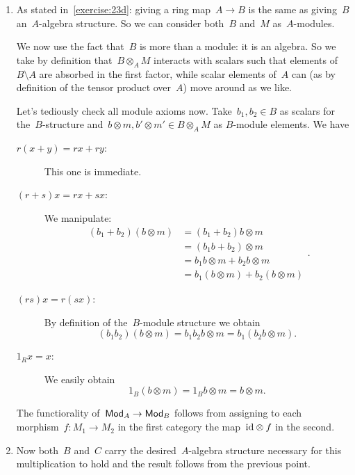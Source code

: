 \begin{exercise} %
  \label{exercise:23k}
  \begin{enumerate}
    \item As stated in~\autoref{exercise:23d}: giving a ring map~$A\to B$ is the same as giving~$B$ an~$A$\nobreakdash-algebra structure. So we can consider both~$B$ and~$M$ as~$A$\nobreakdash-modules.

      We now use the fact that~$B$ is more than a module: it is an algebra. So we take by definition that~$B\otimes_A M$ interacts with scalars such that elements of~$B\setminus A$ are absorbed in the first factor, while scalar elements of~$A$ can (as by definition of the tensor product over~$A$) move around as we like.
      
      Let's tediously check all module axioms now. Take~$b_1,b_2\in B$ as scalars for the~$B$\nobreakdash-structure and~$b\otimes m,b'\otimes m'\in B\otimes_A M$ as $B$\nobreakdash-module elements. We have
      \begin{description}
        \item[$r(x+y)=rx+ry$:] This one is immediate.

        \item[$(r+s)x=rx+sx$:] We manipulate:
          \begin{equation}
            \begin{aligned}
              (b_1+b_2)(b\otimes m)&=(b_1+b_2)b\otimes m \\
              &=(b_1b+b_2)\otimes m \\
              &=b_1b\otimes m+b_2b\otimes m \\
              &=b_1(b\otimes m)+b_2(b\otimes m)
            \end{aligned}.
          \end{equation}

        \item[$(rs)x=r(sx)$:] By definition of the~$B$\nobreakdash-module structure we obtain
          \begin{equation}
            (b_1b_2)(b\otimes m)=b_1b_2b\otimes m=b_1(b_2b\otimes m).
          \end{equation}

        \item[$1_Rx=x$:] We easily obtain
          \begin{equation}
            1_B(b\otimes m)=1_Bb\otimes m=b\otimes m.
          \end{equation}
      \end{description}

      The functiorality of~$\mathsf{Mod}_A\to\mathsf{Mod}_B$ follows from assigning to each morphism~$f\colon M_1\to M_2$ in the first category the map~$\mathrm{id}\otimes f$ in the second.

    \item Now both~$B$ and~$C$ carry the desired~$A$\nobreakdash-algebra structure necessary for this multiplication to hold and the result follows from the previous point.
  \end{enumerate}
\end{exercise}

